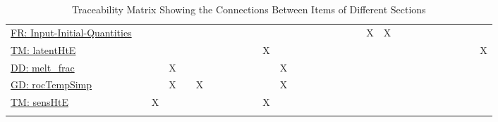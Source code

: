 \documentclass[12pt]{article}
\begin{document}
\begin{longtable}{l l l l l l l l l l l l l l l l l l l l l l l l l l l l l l l}
\\
\hyperref[inputInitQuants]{FR: Input-Initial-Quantities} &  &  &  &  &  &  &  &  &  &  &  &  &  &  &  &  &  &  &  & X & X &  &  &  &  &  &  &  &  & 
\\
\hyperref[TM:latentHtE]{TM: latentHtE} &  &  &  &  &  &  &  &  &  &  & X &  &  &  &  &  &  &  &  &  &  &  &  &  &  &  &  &  &  & X
\\
\hyperref[DD:melt.frac]{DD: melt\_frac} &  &  & X &  &  &  &  &  &  &  &  & X &  &  &  &  &  &  &  &  &  &  &  &  &  &  &  &  &  & 
\\
\hyperref[GD:rocTempSimp]{GD: rocTempSimp} &  &  & X &  & X &  &  &  &  &  &  & X &  &  &  &  &  &  &  &  &  &  &  &  &  &  &  &  &  & 
\\
\hyperref[TM:sensHtE]{TM: sensHtE} &  & X &  &  &  &  &  &  &  &  & X &  &  &  &  &  &  &  &  &  &  &  &  &  &  &  &  &  &  & 
\\
\bottomrule
\caption{Traceability Matrix Showing the Connections Between Items of Different Sections}
\label{Table:Tracey}
\end{longtable}
\end{document}
